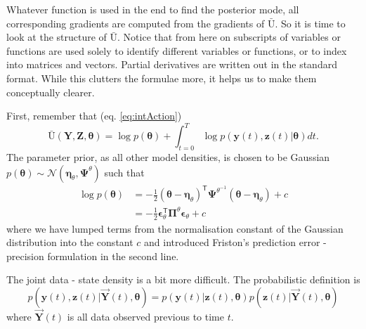 \documentclass[a4paper,10pt]{article}
\newcommand{\bs}[1]{\mathbf{#1}}					%
\newcommand{\bgs}[1]{\boldsymbol{#1}}				%
\newcommand{\tr}{\mathsf{T}}				%
\newcommand{\eq}[1]{\begin{equation} #1 \end{equation}}%
\renewcommand{\ss}{z}         %
\newcommand{\so}{y}         %
\newcommand{\spe}{\epsilon} %
\renewcommand{\sp}{\theta}    %
\newcommand{\ps}{\bs{\ss}}    %
\newcommand{\po}{\bs{\so}}    %
\newcommand{\ppe}{\bgs{\spe}} %
\newcommand{\pp}{\bgs{\sp}} %
\newcommand{\Ps}{\bs{Z}}    %
\newcommand{\Po}{\bs{Y}}    %
\newcommand{\Ua}{\bar{\mathrm{U}}}		%
\newcommand{\N}{\mathcal{N}}			%
\newcommand{\Prec}{\bgs{\Pi}}			%
\begin{document}
Whatever function is used in the end to find the posterior mode, all corresponding gradients are computed from the gradients of $\Ua$. So it is time to look at the structure of $\Ua$. Notice that from here on subscripts of variables or functions are used solely to identify different variables or functions, or to index into matrices and vectors. Partial derivatives are written out in the standard format. While this clutters the formulae more, it helps us to make them conceptually clearer.

First, remember that (eq. \ref{eq:intAction})
\[
    \Ua(\Po,\Ps,\pp) = \log p(\pp) + \int_{t=0}^T \log p(\po(t),\ps(t)|\pp)dt.
\]
The parameter prior, as all other model densities, is chosen to be Gaussian $p(\pp)\sim \N(\bgs{\eta}_\sp,\bgs{\Psi}^\sp)$ such that 
\begin{align}
    \log p(\pp) &= -\frac{1}{2}(\pp - \bgs{\eta}_\sp)^\tr\bgs{\Psi}^{\sp^{-1}}(\pp - \bgs{\eta}_\sp) + c\\
    &= -\frac{1}{2}\ppe_\sp^\tr\Prec^{\sp}\ppe_\sp + c
\end{align}
where we have lumped terms from the normalisation constant of the Gaussian distribution into the constant $c$ and introduced Friston's prediction error - precision formulation in the second line.

The joint data - state density is a bit more difficult. The probabilistic definition is
\eq{
    p(\po(t),\ps(t)|\vec{\Po}(t),\pp) = p(\po(t)|\ps(t),\pp)p(\ps(t)|\vec{\Po}(t),\pp)
}
where $\vec{\Po}(t)$ is all data observed previous to time $t$.
\end{document}
